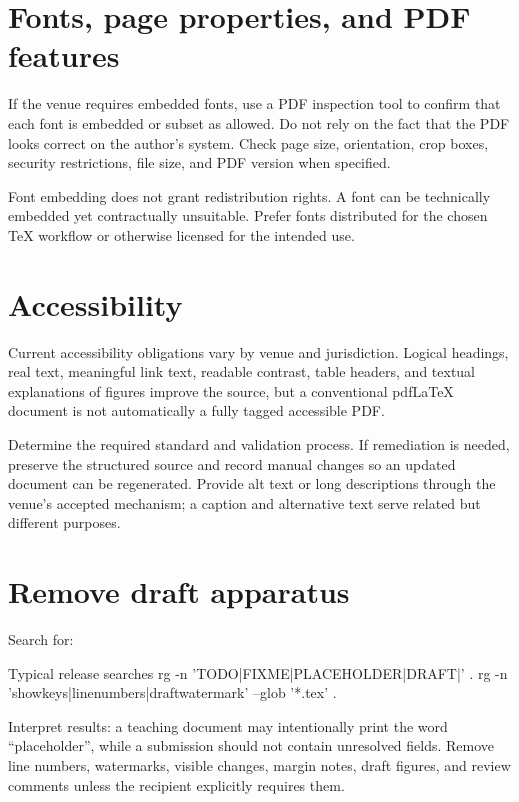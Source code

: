 \section{Fonts, page properties, and PDF features}

If the venue requires embedded fonts, use a PDF inspection tool to confirm that
each font is embedded or subset as allowed. Do not rely on the fact that the PDF
looks correct on the author's system. Check page size, orientation, crop boxes,
security restrictions, file size, and PDF version when specified.

Font embedding does not grant redistribution rights. A font can be technically
embedded yet contractually unsuitable. Prefer fonts distributed for the chosen
TeX workflow or otherwise licensed for the intended use.

\section{Accessibility}

Current accessibility obligations vary by venue and jurisdiction. Logical
headings, real text, meaningful link text, readable contrast, table headers, and
textual explanations of figures improve the source, but a conventional
pdf\LaTeX{} document is not automatically a fully tagged accessible PDF.

Determine the required standard and validation process. If remediation is
needed, preserve the structured source and record manual changes so an updated
document can be regenerated. Provide alt text or long descriptions through the
venue's accepted mechanism; a caption and alternative text serve related but
different purposes.

\section{Remove draft apparatus}

Search for:

\begin{terminalcode}{Typical release searches}
rg -n 'TODO|FIXME|PLACEHOLDER|DRAFT|\?\?' .
rg -n 'showkeys|linenumbers|draftwatermark' --glob '*.tex' .
\end{terminalcode}

Interpret results: a teaching document may intentionally print the word
``placeholder'', while a submission should not contain unresolved fields.
Remove line numbers, watermarks, visible changes, margin notes, draft figures,
and review comments unless the recipient explicitly requires them.

